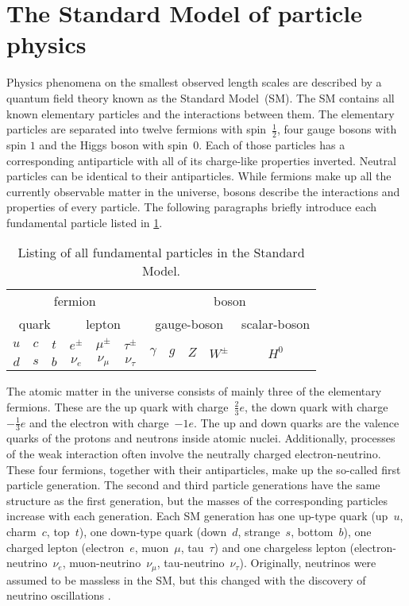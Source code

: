 \section{The Standard Model of particle physics}

Physics phenomena on the smallest observed length scales are described by a quantum field theory known as the Standard Model~(SM).
The SM contains all known elementary particles and the interactions between them.
The elementary particles are separated into twelve fermions with spin~$\frac{1}{2}$, four gauge bosons with spin $1$ and the Higgs boson with spin~$0$.
Each of those particles has a corresponding antiparticle with all of its charge-like properties inverted.
Neutral particles can be identical to their antiparticles.
While fermions make up all the currently observable matter in the universe, bosons describe the interactions and properties of every particle.
The following paragraphs briefly introduce each fundamental particle listed in \cref{tab:sm_particles}.

\begin{table}
    \centering
    \caption{Listing of all fundamental particles in the Standard Model.}
    \begin{tabular}{c c c | c c c | c c c c | c}
        \toprule
        \multicolumn{6}{c|}{fermion} & \multicolumn{5}{c}{boson} \\
        \multicolumn{3}{c}{quark} & \multicolumn{3}{c|}{lepton} & \multicolumn{4}{c}{gauge-boson} & \multicolumn{1}{c}{scalar-boson} \\
        \midrule
        $u$ & $c$ & $t$ & $e^\pm$ & $\mu^\pm$ & $\tau^\pm$ & \multirow{2}{*}{$\gamma$} & \multirow{2}{*}{$g$} & \multirow{2}{*}{$Z$} & \multirow{2}{*}{$W^\pm$} & \multirow{2}{*}{$H^0$} \\
        $d$ & $s$ & $b$ & $\nu_e$ & $\nu_\mu$ & $\nu_\tau$ &&&&& \\
        \bottomrule
    \end{tabular}
    \label{tab:sm_particles}
\end{table}

The atomic matter in the universe consists of mainly three of the elementary fermions. 
These are the up quark with charge~$\frac{2}{3}e$, the down quark with charge~$-\frac{1}{3}e$ and the electron with charge~$-1e$.
The up and down quarks are the valence quarks of the protons and neutrons inside atomic nuclei.
Additionally, processes of the weak interaction often involve the neutrally charged electron-neutrino.
These four fermions, together with their antiparticles, make up the so-called first particle generation.
The second and third particle generations have the same structure as the first generation, but the masses of the corresponding particles increase with each generation.
Each SM generation has one up-type quark (up~$u$, charm~$c$, top~$t$), one down-type quark (down~$d$, strange~$s$, bottom~$b$), one charged lepton (electron~$e$, muon~$\mu$, tau~$\tau$) and one chargeless lepton (electron-neutrino~$\nu_e$, muon-neutrino~$\nu_\mu$, tau-neutrino~$\nu_\tau$).
Originally, neutrinos were assumed to be massless in the SM, but this changed with the discovery of neutrino oscillations \cite{NeutrinoMassSK,NeutrinoMassSNO}. 

